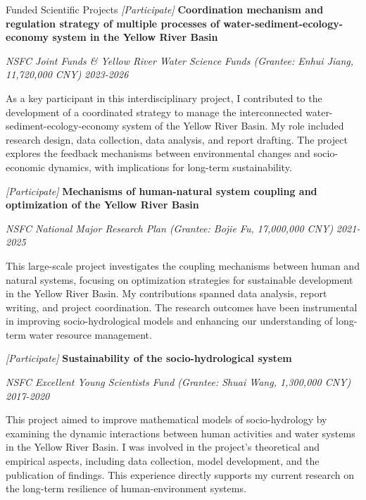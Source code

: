\documentclass{resume} %
\begin{document}
\begin{rSection}{Funded Scientific Projects}
\textit{[Participate]} {\bf Coordination mechanism and regulation strategy of multiple processes of water-sediment-ecology-economy system in the Yellow River Basin}

\textnormal{\em NSFC Joint Funds \& Yellow River Water Science Funds (Grantee: Enhui Jiang, 11,720,000 CNY)} \hfill {\em 2023-2026}

As a key participant in this interdisciplinary project, I contributed to the development of a coordinated strategy to manage the interconnected water-sediment-ecology-economy system of the Yellow River Basin. My role included research design, data collection, data analysis, and report drafting. The project explores the feedback mechanisms between environmental changes and socio-economic dynamics, with implications for long-term sustainability.

\textit{[Participate]} {\bf Mechanisms of human-natural system coupling and optimization of the Yellow River Basin}

\textnormal{\em NSFC National Major Research Plan (Grantee: Bojie Fu, 17,000,000 CNY)} \hfill {\em 2021-2025}

This large-scale project investigates the coupling mechanisms between human and natural systems, focusing on optimization strategies for sustainable development in the Yellow River Basin. My contributions spanned data analysis, report writing, and project coordination. The research outcomes have been instrumental in improving socio-hydrological models and enhancing our understanding of long-term water resource management.

\textit{[Participate]} {\bf Sustainability of the socio-hydrological system}

\textnormal{\em NSFC Excellent Young Scientists Fund (Grantee: Shuai Wang, 1,300,000 CNY)} \hfill {\em 2017-2020}

This project aimed to improve mathematical models of socio-hydrology by examining the dynamic interactions between human activities and water systems in the Yellow River Basin. I was involved in the project's theoretical and empirical aspects, including data collection, model development, and the publication of findings. This experience directly supports my current research on the long-term resilience of human-environment systems.

\end{rSection}
\end{document}
